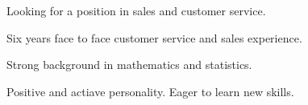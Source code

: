 

\begin{cventries}

  \cventry
    {} %
    {} %
    {} %
    {} %
    {
      \begin{cvitems} %
      \item Looking for a position in sales and customer service.
      \item Six years face to face customer service and sales experience.
      \item Strong background in mathematics and statistics.
      \item Positive and actiave personality.  Eager to learn new skills.
      \end{cvitems}
    }


\end{cventries}
